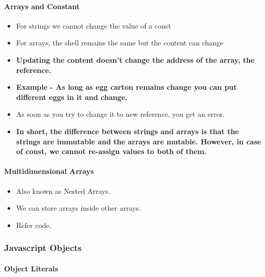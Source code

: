 \documentclass[
  paper=a4,
  ,captions=tableheading
]{scrartcl}
\providecommand{\tightlist}{%
  \setlength{\itemsep}{0pt}\setlength{\parskip}{0pt}}
\begin{document}
\hypertarget{arrays-and-constant}{%
\paragraph{Arrays and Constant}\label{arrays-and-constant}}

\begin{itemize}
\tightlist
\item
  For strings we cannot change the value of a const
\item
  For arrays, the shell remains the same but the content can change
\item
  \textbf{Updating the content doesn't change the address of the array,
  the reference.}
\item
  \textbf{Example - As long as egg carton remains change you can put
  different eggs in it and change.}
\item
  As soon as you try to change it to new reference, you get an error.
\item
  \textbf{In short, the difference between strings and arrays is that
  the strings are immutable and the arrays are mutable. However, in case
  of const, we cannot re-assign values to both of them.}
\end{itemize}

\hypertarget{multidimensional-arrays}{%
\paragraph{Multidimensional Arrays}\label{multidimensional-arrays}}

\begin{itemize}
\tightlist
\item
  Also known as Nested Arrays.
\item
  We can store arrays inside other arrays.
\item
  Refer code.
\end{itemize}

\hypertarget{javascript-objects}{%
\subsubsection{Javascript Objects}\label{javascript-objects}}

\hypertarget{object-literals}{%
\paragraph{Object Literals}\label{object-literals}}
\end{document}
